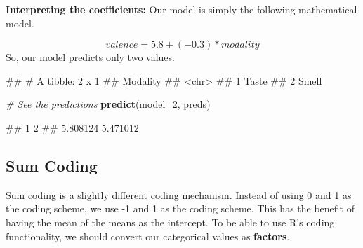 \documentclass[
]{book}
\newenvironment{Shaded}{\begin{snugshade}}{\end{snugshade}}
\newcommand{\AttributeTok}[1]{\textcolor[rgb]{0.13,0.29,0.53}{#1}}
\newcommand{\CommentTok}[1]{\textcolor[rgb]{0.56,0.35,0.01}{\textit{#1}}}
\newcommand{\FunctionTok}[1]{\textcolor[rgb]{0.13,0.29,0.53}{\textbf{#1}}}
\newcommand{\NormalTok}[1]{#1}
\newcommand{\OtherTok}[1]{\textcolor[rgb]{0.56,0.35,0.01}{#1}}
\newcommand{\SpecialCharTok}[1]{\textcolor[rgb]{0.81,0.36,0.00}{\textbf{#1}}}
\begin{document}
\textbf{Interpreting the coefficients:} Our model is simply the following mathematical model.

\[valence = 5.8 + (−0.3) * modality\]
So, our model predicts only two values.

\begin{Shaded}
\end{Shaded}

\begin{Shaded}
\begin{Highlighting}[]
\NormalTok{\#\# \# A tibble: 2 x 1}
\NormalTok{\#\#   Modality}
\NormalTok{\#\#   \textless{}chr\textgreater{}   }
\NormalTok{\#\# 1 Taste   }
\NormalTok{\#\# 2 Smell}
\end{Highlighting}
\end{Shaded}

\begin{Shaded}
\begin{Highlighting}[]
\CommentTok{\# See the predictions}
\FunctionTok{predict}\NormalTok{(model\_2, preds)}
\end{Highlighting}
\end{Shaded}

\begin{Shaded}
\begin{Highlighting}[]
\NormalTok{\#\#        1        2 }
\NormalTok{\#\# 5.808124 5.471012}
\end{Highlighting}
\end{Shaded}

\hypertarget{sum-coding}{%
\subsection{Sum Coding}\label{sum-coding}}

Sum coding is a slightly different coding mechanism. Instead of using 0 and 1 as the coding scheme, we use -1 and 1 as the coding scheme. This has the benefit of having the mean of the means as the intercept. To be able to use R's coding functionality, we should convert our categorical values as \textbf{factors}.
\end{document}
